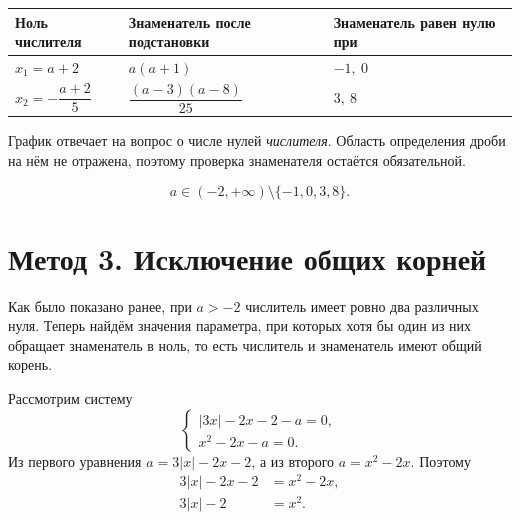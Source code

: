 \begin{center}
  \renewcommand{\arraystretch}{1.42}
  \begin{tabularx}{\textwidth}{
      >{\centering\arraybackslash}p{}
      >{\centering\arraybackslash}p{}
      >{\centering\arraybackslash}X
    }
    \toprule
    \rowcolor{TableHeader}
    Ноль числителя & Знаменатель после подстановки &
      Знаменатель равен нулю при \\
    \midrule
    \(x_1=a+2\) & \(a(a+1)\) & \(-1,\ 0\) \\
    \addlinespace[0.25em]
    \(x_2=-\dfrac{a+2}{5}\) & \(\dfrac{(a-3)(a-8)}{25}\) & \(3,\ 8\) \\
    \bottomrule
  \end{tabularx}
\end{center}

\begin{warningbox}
  График отвечает на вопрос о числе нулей \emph{числителя}. Область
  определения дроби на нём не отражена, поэтому проверка знаменателя остаётся
  обязательной.
\end{warningbox}

\begin{resultbox}
  \[
    \boxed{a\in(-2,+\infty)\setminus\{-1,0,3,8\}}.
  \]
\end{resultbox}

\section{Метод 3. Исключение общих корней}

\begin{methodintro}
  Как было показано ранее, при \(a>-2\) числитель имеет ровно два различных
  нуля. Теперь найдём значения параметра, при которых хотя бы один из них
  обращает знаменатель в ноль, то есть числитель и знаменатель имеют общий
  корень.
\end{methodintro}

Рассмотрим систему
\[
  \begin{cases}
    |3x|-2x-2-a=0,\\
    x^2-2x-a=0.
  \end{cases}
\]
Из первого уравнения \(a=3|x|-2x-2\), а из второго \(a=x^2-2x\). Поэтому
\[
  \begin{aligned}
    3|x|-2x-2&=x^2-2x,\\
    3|x|-2&=x^2.
  \end{aligned}
\]


